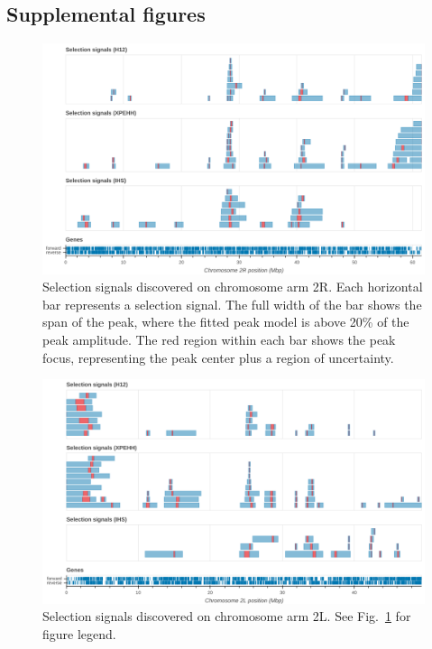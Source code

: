 \begin{refsection}
\clearpage
\section{Supplemental figures}\label{sec:ch5-supplemental-figures}


\begin{figure}[h!]
\centering
\includegraphics[width=1.1\textwidth,center]{artwork/chapter5/signals_2R.png}
\caption{Selection signals discovered on chromosome arm 2R.
%
Each horizontal bar represents a selection signal.
%
The full width of the bar shows the span of the peak, where the fitted peak model is above 20\% of the peak amplitude.
%
The red region within each bar shows the peak focus, representing the peak center plus a region of uncertainty.
%
}
\label{fig:signals_2R}
\end{figure}


\clearpage
\begin{figure}[h!]
\centering
\includegraphics[width=1.1\textwidth,center]{artwork/chapter5/signals_2L.png}
\caption{Selection signals discovered on chromosome arm 2L.
%
See Fig.~\ref{fig:signals_2R} for figure legend.
}
\label{fig:signals_2L}
\end{figure}



\end{refsection}
